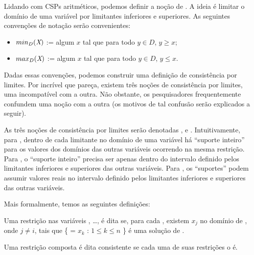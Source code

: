 \documentclass{article}
\begin{document}
Lidando com CSPs aritméticos, podemos definir a noção de . A ideia é limitar o domínio
de uma variável por limitantes inferiores e superiores. As seguintes convenções de notação serão convenientes:

\begin{itemize}
  \item $min_D(\textit{X})$ := algum $x$ tal que para todo $y \in D$, $y \geq x$;
  \item $max_D(\textit{X})$ := algum $x$ tal que para todo $y \in D$, $y  \leq x$.
\end{itemize}

Dadas essas convenções, podemos construir uma definição de consistência por limites. Por incrível
que pareça, existem três noções de consistência por limites, uma incompatível com a outra. Não
obstante, os pesquisadores frequentemente confundem uma noção com a outra (os motivos de tal
confusão serão explicados a seguir).

As três noções de consistência por limites serão denotadas \boundd, \boundz{} e \boundr.
Intuitivamente, para \boundd, dentro de cada limitante no domínio de uma variável há ``suporte
inteiro'' para os valores dos domínios das outras variáveis ocorrendo na mesma restrição.
Para \boundz, o ``suporte inteiro'' precisa ser apenas dentro do intervalo definido pelos limitantes
inferiores e superiores das outras variáveis.
Para \boundr, os ``suportes'' podem assumir valores reais no intervalo definido pelos limitantes
inferiores e superiores das outras variáveis.

Mais formalmente, temos as seguintes definições:

\begin{definition}
  Uma restrição  nas variáveis , \dots,  é dita
  se, para cada , existem  $x_j$ no domínio de , onde $j \neq i$, tais que \{ = $x_k$ : $1 \leq k \leq n$ \}
  é uma solução de .


  Uma restrição composta é dita \boundd{} consistente se cada uma de suas restrições o é.
\end{definition}
\end{document}
